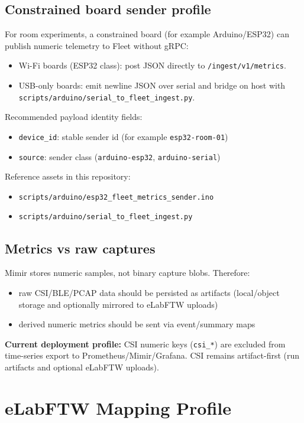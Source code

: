 \documentclass[11pt,a4paper]{article}
\begin{document}
\subsection{Constrained board sender profile}
For room experiments, a constrained board (for example Arduino/ESP32) can publish numeric telemetry to Fleet without gRPC:
\begin{itemize}
  \item Wi-Fi boards (ESP32 class): post JSON directly to \texttt{/ingest/v1/metrics}.
  \item USB-only boards: emit newline JSON over serial and bridge on host with \texttt{scripts/arduino/serial\_to\_fleet\_ingest.py}.
\end{itemize}
Recommended payload identity fields:
\begin{itemize}
  \item \texttt{device\_id}: stable sender id (for example \texttt{esp32-room-01})
  \item \texttt{source}: sender class (\texttt{arduino-esp32}, \texttt{arduino-serial})
\end{itemize}
Reference assets in this repository:
\begin{itemize}
  \item \texttt{scripts/arduino/esp32\_fleet\_metrics\_sender.ino}
  \item \texttt{scripts/arduino/serial\_to\_fleet\_ingest.py}
\end{itemize}

\subsection{Metrics vs raw captures}
Mimir stores numeric samples, not binary capture blobs.
Therefore:
\begin{itemize}
  \item raw CSI/BLE/PCAP data should be persisted as artifacts (local/object storage and optionally mirrored to eLabFTW uploads)
  \item derived numeric metrics should be sent via event/summary maps
\end{itemize}
\textbf{Current deployment profile:} CSI numeric keys (\texttt{csi\_*}) are excluded from time-series export to Prometheus/Mimir/Grafana.
CSI remains artifact-first (run artifacts and optional eLabFTW uploads).

\section{eLabFTW Mapping Profile}
\end{document}

